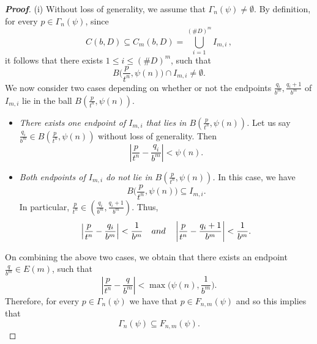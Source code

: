 \documentclass[10pt,a4paper]{amsart}
\begin{document}
\begin{proof}[\rm \textbf{Proof}] (i) Without loss of generality, we assume that $\Gamma_{n}(\psi)\neq\emptyset$. By definition, for every $p\in\Gamma_{n}(\psi)$, since $$C(b,D)\subseteq C_{m}(b,D)=\bigcup_{i=1}^{(\#D)^{m}}I_{m,i}  \, , $$ it follows that there exists $1\leq i\leq (\#D)^{m}$, such that 
$$ B\big(\textstyle{\frac{p}{t^{n}},\psi(n)}\big)\cap I_{m,i}\neq\emptyset.$$
We now consider two cases depending on  whether or not the endpoints $ \frac{q_{i}}{b^{m}},\frac{q_{i}+1}{b^{m}} $   of $I_{m,i}$ lie  in the ball $ B\left(\frac{p}{t^{n}},\psi(n)\right)$. 
\begin{itemize}
    \item {\em  There exists  one endpoint of $I_{m,i}$ that lies in 
$B\left(\frac{p}{t^{n}},\psi(n)\right)$.} Let us say $\frac{q_{i}}{b^{m}}\in B\left(\frac{p}{t^{n}},\psi(n)\right)$ without loss of generality. Then
$$\left|\frac{p}{t^{n}}-\frac{q_{i}}{b^{m}}\right|<\psi(n).$$
    \item {\em   Both endpoints of $I_{m,i}$ do not lie in $B\left(\frac{p}{t^{n}},\psi(n)\right)$.} In this case, we have 
$$B\big(\textstyle{\frac{p}{t^{n}},\psi(n)}\big) \subseteq I_{m,i}.$$
In particular, $\frac{p}{t^{n}}\in\left(\frac{q_{i}}{b^{m}},\frac{q_{i}+1}{b^{m}}\right)$. Thus,
$$\left|\frac{p}{t^{n}}-\frac{q_{i}}{b^{m}}\right|<\frac{1}{b^{m}}\quad {\rm and}\quad \left|\frac{p}{t^{n}}-\frac{q_{i}+1}{b^{m}}\right|<\frac{1}{b^{m}}.$$
\end{itemize}


\noindent On combining the above two cases, we obtain that there exists an endpoint $\frac{q}{b^{m}}\in E(m)$, such that $$\left|\frac{p}{t^{n}}-\frac{q}{b^{m}}\right|<\max\Big(\psi(n) ,\frac{1}{b^{m}}\Big).$$
Therefore, for every $p\in\Gamma_{n}(\psi)$ we have that  $p\in F_{n,m}(\psi)$ and so  this implies that 
$$\Gamma_{n}(\psi)\subseteq F_{n,m}(\psi).$$



\end{proof}
\end{document}
